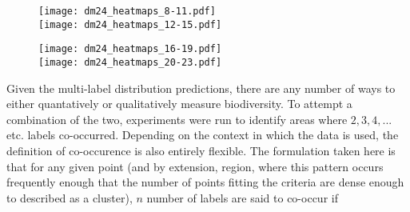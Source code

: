\begin{figure}[H]
    \texttt{[image: dm24\_heatmaps\_8-11.pdf]}\\
    \texttt{[image: dm24\_heatmaps\_12-15.pdf]}
    \caption{}
    \label{fig:dm24_8-15}
\end{figure}

\begin{figure}[H]
    \texttt{[image: dm24\_heatmaps\_16-19.pdf]}\\
    \texttt{[image: dm24\_heatmaps\_20-23.pdf]}
    \caption{}
    \label{fig:dm24_16-23}
\end{figure}

Given the multi-label distribution predictions, there are any number of ways to either quantatively or qualitatively measure biodiversity. To attempt a combination of the two, experiments were run to identify areas where $2, 3, 4,...$ etc. labels co-occurred. Depending on the context in which the data is used, the definition of co-occurence is also entirely flexible. The formulation taken here is that for any given point (and by extension, region, where this pattern occurs frequently enough that the number of points fitting the criteria are dense enough to described as a cluster), $n$ number of labels are said to co-occur if 


